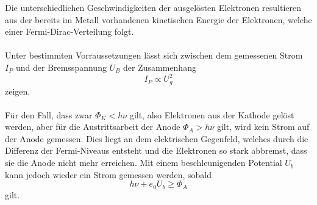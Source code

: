 \noindent
Die unterschiedlichen Geschwindigkeiten der ausgelösten Elektronen resultieren aus der bereits im Metall vorhandenen kinetischen Energie der
Elektronen, welche einer Fermi-Dirac-Verteilung folgt.
\\
\\
\noindent
Unter bestimmten Vorraussetzungen lässt sich zwischen dem gemessenen Strom $I_{P}$ und der Bremsspannung $U_B$ der Zusammenhang
\begin{equation*}
    I_{P}\propto U^2_g
\end{equation*}
zeigen.
\\
\\\noindent
Für den Fall, dass zwar $\Phi_K<h\nu$ gilt, also Elektronen aus der Kathode gelöst werden, aber für die Austrittsarbeit der Anode
$\Phi_A>h\nu$ gilt, wird kein Strom auf der Anode gemessen. Dies liegt an dem elektrischen Gegenfeld, welches durch die Differenz der
Fermi-Niveaus entsteht und die Elektronen so stark abbremst, dass sie die Anode nicht mehr erreichen.
Mit einem beschleunigenden Potential $U_b$ kann jedoch wieder ein Strom gemessen werden, sobald
\begin{equation*}
    h\nu+e_0U_{b}\geq \Phi_A
\end{equation*}
gilt.
